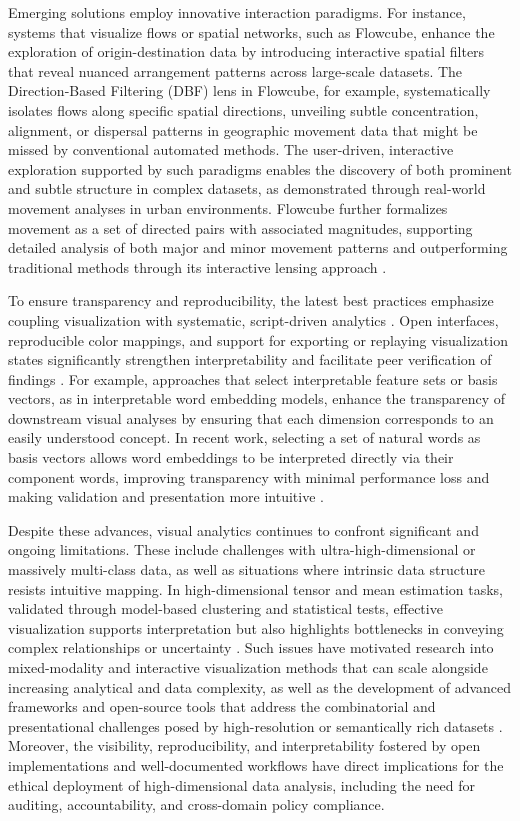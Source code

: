 \documentclass[sigconf]{acmart}
\begin{document}
Emerging solutions employ innovative interaction paradigms. For instance, systems that visualize flows or spatial networks, such as Flowcube, enhance the exploration of origin-destination data by introducing interactive spatial filters that reveal nuanced arrangement patterns across large-scale datasets. The Direction-Based Filtering (DBF) lens in Flowcube, for example, systematically isolates flows along specific spatial directions, unveiling subtle concentration, alignment, or dispersal patterns in geographic movement data that might be missed by conventional automated methods. The user-driven, interactive exploration supported by such paradigms enables the discovery of both prominent and subtle structure in complex datasets, as demonstrated through real-world movement analyses in urban environments. Flowcube further formalizes movement as a set of directed pairs with associated magnitudes, supporting detailed analysis of both major and minor movement patterns and outperforming traditional methods through its interactive lensing approach \cite{ref53}.

To ensure transparency and reproducibility, the latest best practices emphasize coupling visualization with systematic, script-driven analytics \cite{ref94,ref99,ref115}. Open interfaces, reproducible color mappings, and support for exporting or replaying visualization states significantly strengthen interpretability and facilitate peer verification of findings \cite{ref86,ref115}. For example, approaches that select interpretable feature sets or basis vectors, as in interpretable word embedding models, enhance the transparency of downstream visual analyses by ensuring that each dimension corresponds to an easily understood concept. In recent work, selecting a set of natural words as basis vectors allows word embeddings to be interpreted directly via their component words, improving transparency with minimal performance loss and making validation and presentation more intuitive \cite{ref115}.

Despite these advances, visual analytics continues to confront significant and ongoing limitations. These include challenges with ultra-high-dimensional or massively multi-class data, as well as situations where intrinsic data structure resists intuitive mapping. In high-dimensional tensor and mean estimation tasks, validated through model-based clustering and statistical tests, effective visualization supports interpretation but also highlights bottlenecks in conveying complex relationships or uncertainty \cite{ref58,ref94,ref95}. Such issues have motivated research into mixed-modality and interactive visualization methods that can scale alongside increasing analytical and data complexity, as well as the development of advanced frameworks and open-source tools that address the combinatorial and presentational challenges posed by high-resolution or semantically rich datasets \cite{ref86,ref99}. Moreover, the visibility, reproducibility, and interpretability fostered by open implementations and well-documented workflows have direct implications for the ethical deployment of high-dimensional data analysis, including the need for auditing, accountability, and cross-domain policy compliance.
\end{document}
